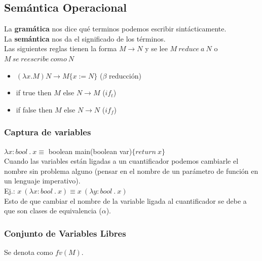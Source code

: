 \documentclass[10pt,a4paper]{article}
\begin{document}
\subsection{Semántica Operacional}
La \textbf{gramática} nos dice qué terminos podemos escribir sintácticamente. \\
La \textbf{semántica} nos da el significado de los términos. \\
Las siguientes reglas tienen la forma $M \rightarrow N$ y se lee $M \ reduce \ a \ N$ o $M \ se \ reescribe \ como \ N$ \\
\begin{itemize}
    \item $(\lambda x . M) N \rightarrow M \{x := N\}$ ($\beta$ reducción)
    \item if true then $M$ else $N \rightarrow M$ ($if_{t}$)
    \item if false then $M$ else $N \rightarrow N$ ($if_{f}$)
\end{itemize}
\subsubsection{Captura de variables}
$\lambda x:bool \ . \ x \equiv $ boolean main(boolean var)$\{return \ x\}$ \\
Cuando las variables están ligadas a un cuantificador podemos cambiarle el nombre sin problema alguno (pensar en el nombre de un parámetro de función en un lenguaje imperativo). \\
Ej.: $x \ (\lambda x:bool \ . \ x) \equiv x \ (\lambda y:bool \ . \ x)$ \\
Esto de que cambiar el nombre de la variable ligada al cuantificador se debe a que son clases de equivalencia ($\alpha$).

\subsubsection{Conjunto de Variables Libres}
Se denota como $fv(M)$.
\end{document}
